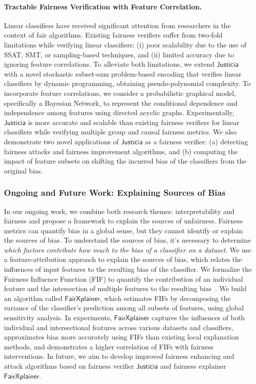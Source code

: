\documentclass{article}
\begin{document}
\paragraph{Tractable Fairness Verification with Feature Correlation.} Linear classifiers have received significant attention from researchers in the context of fair algorithms. Existing fairness verifiers suffer from two-fold limitations while verifying linear classifiers: (i) poor scalability due to the use of SSAT, SMT, or sampling-based techniques, and (ii) limited accuracy due to ignoring feature correlations. To alleviate both limitations, we extend $\mathsf{Justicia}$ with a novel stochastic subset-sum problem-based encoding that verifies linear classifiers by dynamic programming, obtaining pseudo-polynomial complexity. To incorporate feature correlations, we consider a probabilistic graphical model, specifically a Bayesian Network, to represent the conditional dependence and independence among features using directed acyclic graphs. Experimentally, $\mathsf{Justicia}$ is more accurate and scalable than existing fairness verifiers for linear classifiers while verifying multiple group and causal fairness metrics. We also demonstrate two novel applications of $\mathsf{Justicia}$ as a fairness verifier: (a) detecting fairness attacks and fairness improvement algorithms, and (b) computing the impact of feature subsets on shifting the incurred bias of the classifiers from the original bias.






\subsubsection*{Ongoing and Future Work: Explaining Sources of Bias} In our ongoing work, we combine both research themes: interpretability and fairness and propose a framework to explain the sources of unfairness.
Fairness metrics can quantify bias in a global sense, but they cannot identify or explain the sources of bias. To understand the sources of bias, it's necessary to determine \textit{which factors contribute how much to the bias of a classifier on a dataset}. We use a feature-attribution approach to explain the sources of bias, which relates the influences of input features to the resulting bias of the classifier. We formalize the Fairness Influence Function (FIF) to quantify the contribution of an individual feature and the intersection of multiple features to the resulting bias~\cite{ghosh2022how}. We build an algorithm called $\mathsf{FairXplainer}$, which estimates FIFs by decomposing the variance of the classifier's prediction among all subsets of features, using global sensitivity analysis. In experiments, $\mathsf{FairXplainer}$ captures the influences of both individual and intersectional features across various datasets and classifiers, approximates bias more accurately using FIFs than existing local explanation methods, and demonstrates a higher correlation of FIFs with fairness interventions. In future, we aim to develop improved fairness enhancing and attack algorithms based on fairness verifier $ \mathsf{Justicia} $ and fairness explainer $ \mathsf{FairXplainer} $. 






\end{document}
